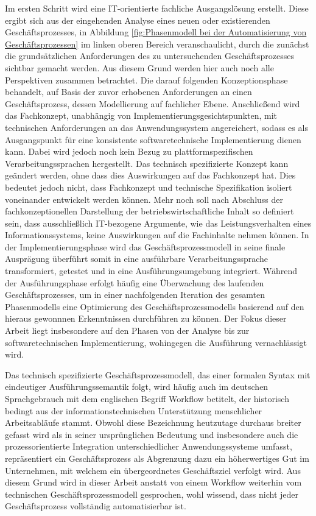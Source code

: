 Im ersten Schritt wird eine \ac{IT}-orientierte fachliche Ausgangslösung erstellt.
Diese ergibt sich aus der eingehenden Analyse eines neuen oder existierenden Geschäftsprozesses, in Abbildung \ref{fig:Phasenmodell bei der Automatisierung von Geschäftsprozessen} im linken oberen Bereich veranschaulicht, durch die zunächst die grundsätzlichen Anforderungen des zu untersuchenden Geschäftsprozesses sichtbar gemacht werden. 
Aus diesem Grund werden hier auch noch alle Perspektiven zusammen betrachtet.
Die darauf folgenden Konzeptionsphase behandelt, auf Basis der zuvor erhobenen Anforderungen an einen Geschäftsprozess, dessen Modellierung auf fachlicher Ebene. 
Anschließend wird das Fachkonzept, unabhängig von Implementierungsgesichtspunkten, mit technischen Anforderungen an das Anwendungssystem angereichert, sodass es als Ausgangspunkt für eine konsistente softwaretechnische Implementierung dienen kann. 
Dabei wird jedoch noch kein Bezug zu plattformspezifischen Verarbeitungssprachen hergestellt. 
Das technisch spezifizierte Konzept kann geändert werden, ohne dass dies Auswirkungen auf das Fachkonzept hat.
Dies bedeutet jedoch nicht, dass Fachkonzept und technische Spezifikation isoliert voneinander entwickelt werden können. 
Mehr noch soll nach Abschluss der fachkonzeptionellen Darstellung der betriebswirtschaftliche Inhalt so definiert sein, dass ausschließlich \ac{IT}-bezogene Argumente, wie das Leistungsverhalten eines Informationssystems, keine Auswirkungen auf die Fachinhalte nehmen können. 
In der Implementierungsphase wird das Geschäftsprozessmodell in seine finale Ausprägung überführt somit in eine ausführbare Verarbeitungssprache transformiert, getestet und in eine Ausführungsumgebung integriert.
Während der Ausführungsphase erfolgt häufig eine Überwachung des laufenden Geschäftsprozesses, um in einer nachfolgenden Iteration des gesamten Phasenmodells eine Optimierung des Geschäftsprozessmodells basierend auf den hieraus gewonnnen Erkenntnissen durchführen zu können.
Der Fokus dieser Arbeit liegt insbesondere auf den Phasen von der Analyse bis zur softwaretechnischen Implementierung, wohingegen die Ausführung vernachlässigt wird.











Das technisch spezifizierte Geschäftsprozessmodell, das einer formalen Syntax mit eindeutiger Ausführungssemantik folgt, wird häufig auch im deutschen Sprachgebrauch mit dem englischen Begriff Workflow betitelt, der historisch bedingt aus der informationstechnischen Unterstützung menschlicher Arbeitsabläufe stammt. 
Obwohl diese Bezeichnung heutzutage durchaus breiter gefasst wird als in seiner ursprünglichen Bedeutung und insbesondere auch die prozessorientierte Integration unterschiedlicher Anwendungssysteme umfasst, repräsentiert ein Geschäftsprozess als Abgrenzung dazu ein höherwertiges Gut im Unternehmen, mit welchem ein übergeordnetes Geschäftsziel verfolgt wird. 
Aus diesem Grund wird in dieser Arbeit anstatt von einem Workflow weiterhin vom technischen Geschäftsprozessmodell gesprochen, wohl wissend, dass nicht jeder Geschäftsprozess vollständig automatisierbar ist.

